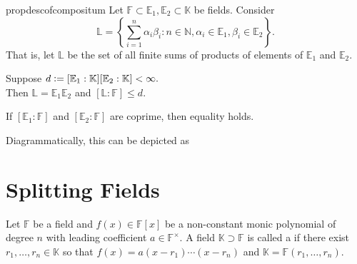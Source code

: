 \begin{restatable}[]{prop}{descofcompositum}
\label{prop:descofcompositum}
    Let $\mathbb{F} \subset \mathbb{E}_1, \mathbb{E}_2 \subset \mathbb{K}$ be fields. Consider
    \begin{equation*} 
        \mathbb{L} = \left\{\sum_{i = 1}^{n} \alpha_i\beta_i : n \in \mathbb{N}, \alpha_i \in \mathbb{E}_1, \beta_i \in \mathbb{E}_2\right\}.
    \end{equation*}
    That is, let $\mathbb{L}$ be the set of all finite sums of products of elements of $\mathbb{E}_1$ and $\mathbb{E}_2.$

    Suppose $d \vcentcolon= [\mathbb{E}_1 : \mathbb{K}][\mathbb{E}_2 : \mathbb{K}] < \infty.$ \\
    Then $\mathbb{L} = \mathbb{E}_1\mathbb{E}_2$ and $[\mathbb{L} : \mathbb{F}] \le d.$ 

     If $[\mathbb{E}_1 : \mathbb{F}]$ and $[\mathbb{E}_2 : \mathbb{F}]$ are coprime, then equality holds. \hfill\hyperref[prop:descofcompositum2]{\downsym}
\end{restatable}

Diagrammatically, this can be depicted as
\begin{center}
\end{center}

\section{Splitting Fields}

\begin{defn}%
    Let $\mathbb{F}$ be a field and $f(x) \in \mathbb{F}[x]$ be a non-constant monic polynomial of degree $n$ with leading coefficient $a \in \mathbb{F}^\times.$ A field $\mathbb{K} \supset \mathbb{F}$ is called a  if there exist $r_1, \ldots, r_n \in \mathbb{K}$ so that $f(x) = a(x - r_1)\cdots(x - r_n)$ and $\mathbb{K} = \mathbb{F}(r_1, \ldots, r_n).$
\end{defn}

